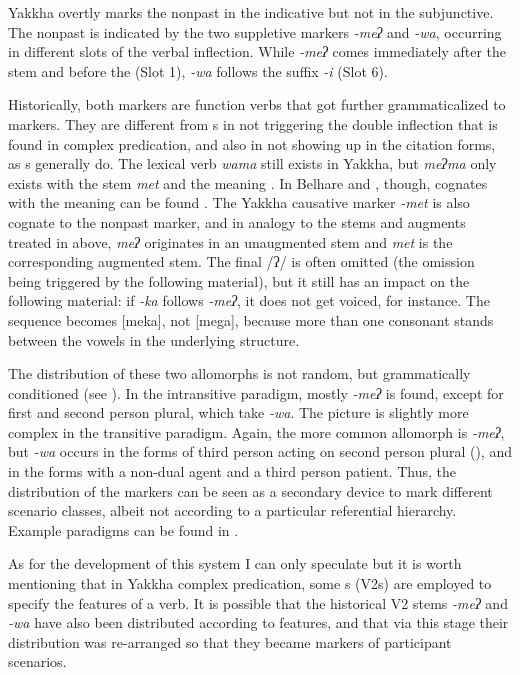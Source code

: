 Yakkha overtly marks the nonpast in the indicative but not in the subjunctive. The nonpast is indicated by the two suppletive markers \emph{-meʔ} and \emph{-wa}, occurring in different slots of the verbal inflection. While  \emph{-meʔ} comes immediately after the stem and before the  (Slot 1), \emph{-wa} follows the suffix \emph{-i}  (Slot 6). 

Historically, both markers are function verbs that got further grammaticalized to  markers. They are different from s in not triggering the double inflection that is found in complex predication, and also in not showing up in the citation forms, as s generally do. The lexical verb \emph{wama}  still exists in Yakkha, but \emph{meʔma} only exists with the stem \emph{met} and the meaning . In Belhare and , though, cognates with the meaning  can be found  \citep{Bickel1997Dictionary, Doornenbal2009A-grammar}. The Yakkha causative marker \emph{-met} is also cognate to the nonpast marker, and in analogy to the stems and augments treated in  above,  \emph{meʔ} originates in an unaugmented stem and \emph{met} is the corresponding augmented stem. The final /ʔ/ is often omitted (the omission being triggered by the following material), but it still has an impact on the following material: if \emph{-ka} follows \emph{-meʔ}, it does not get voiced, for instance. The sequence becomes [meka], not [mega], because more than one consonant stands between the vowels  in the underlying structure.


The distribution of these two allomorphs is not random, but grammatically conditioned (see ). In the intransitive paradigm, mostly \emph{-meʔ} is found, except for first and second person plural, which take \emph{-wa}. The picture is slightly more complex in the transitive paradigm. Again, the more common allomorph is \emph{-meʔ}, but \emph{-wa} occurs in the forms of third person acting on second person plural (), and in the forms with a non-dual agent and a third person patient. Thus, the distribution of the markers can be seen as  a secondary device to mark different scenario classes, albeit not according to a particular referential hierarchy.  Example paradigms can be found in . 

As for the development of this system I can only speculate but it is worth mentioning that in Yakkha complex predication, some s (V2s) are employed to specify the  features of a verb. It is possible that the historical V2 stems \emph{-meʔ} and \emph{-wa} have also been distributed according to  features, and that via this stage their distribution was re-arranged so that they became markers of participant scenarios.


